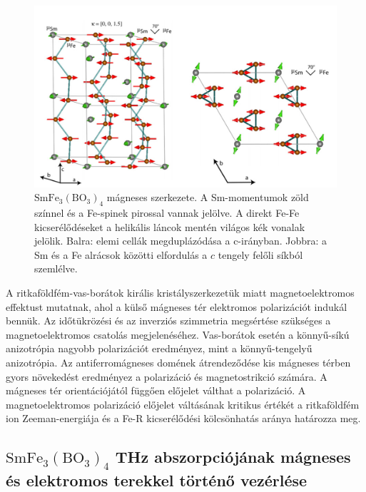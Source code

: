 \documentclass[a4paper,12pt]{article}
\numberwithin{equation}{section}
\begin{document}
   \begin{figure}[H]
\begin{center}
\includegraphics[width=\linewidth]{mágneses szerkezet/magnszerk.png}
\end{center}
\caption{
  ${\mathrm{SmFe_3(BO_3)_4}}$ mágneses szerkezete. A Sm-momentumok zöld színnel és a Fe-spinek pirossal vannak jelölve. A direkt Fe-Fe kicserélődéseket a helikális láncok mentén világos kék vonalak jelölik. Balra: elemi cellák megduplázódása a c-irányban. Jobbra: a Sm és a Fe alrácsok közötti elfordulás a $c$ tengely felőli síkból szemlélve. 
\cite{2012_JPhys} }

\label{fig:magnszerk}
\end{figure}


A ritkaföldfém-vas-borátok királis kristályszerkezetük miatt magnetoelektromos effektust mutatnak, ahol a külső mágneses tér elektromos polarizációt indukál bennük. Az időtükrözési és az inverziós szimmetria megsértése szükséges a magnetoelektromos csatolás megjelenéséhez. Vas-borátok esetén a könnyű-síkú anizotrópia nagyobb polarizációt eredményez, mint a könnyű-tengelyű anizotrópia. Az antiferromágneses domének átrendeződése kis mágneses térben gyors növekedést eredményez a polarizáció és magnetostrikció számára. A mágneses tér orientációjától függően előjelet válthat a polarizáció. A magnetoelektromos polarizáció előjelet váltásának kritikus értékét a ritkaföldfém ion Zeeman-energiája és a Fe-R kicserélődési kölcsönhatás aránya határozza meg.



 \subsection{\texorpdfstring{$\bm{\mathrm{SmFe_3(BO_3)_4}}$}{TEXT} THz abszorpciójának mágneses és elektromos terekkel történő vezérlése \label{ch:2.3}}
\end{document}
